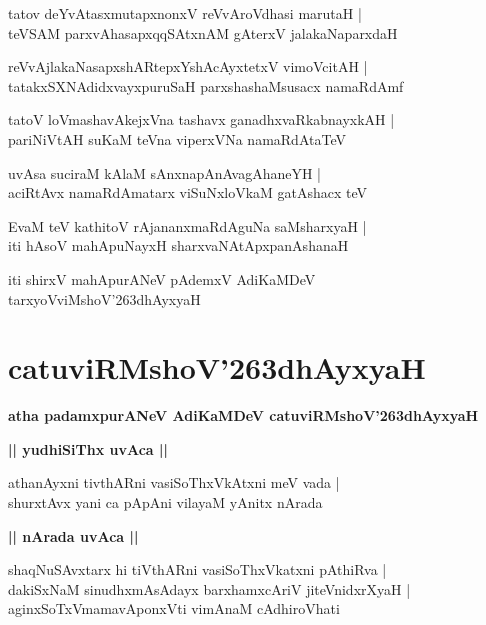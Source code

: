 \documentclass[twoside,12pt,openright]{book}
\def\S{\char'263}
\newcounter{shloka}[chapter]
\def\uvaca#1{\centerline{{\large\textbf{#1}}}}
\begin{document}
\begin{shloka}
tatov deYvAtasxmutapxnonxV reVvAroVdhasi marutaH |\\
teVSAM parxvAhasapxqqSAtxnAM gAterxV jalakaNaparxdaH 
\end{shloka}

\begin{shloka}
reVvAjlakaNasapxshARtepxYshAcAyxtetxV vimoVcitAH |\\
tatakxSXNAdidxvayxpuruSaH parxshashaMsusacx namaRdAmf 
\end{shloka}

\begin{shloka}
tatoV loVmashavAkejxVna tashavx ganadhxvaRkabnayxkAH |\\
pariNiVtAH suKaM teVna viperxVNa namaRdAtaTeV 
\end{shloka}

\begin{shloka}
uvAsa suciraM kAlaM sAnxnapAnAvagAhaneYH |\\
aciRtAvx namaRdAmatarx viSuNxloVkaM gatAshacx teV 
\end{shloka}

\begin{shloka}
EvaM teV kathitoV rAjananxmaRdAguNa saMsharxyaH |\\
iti hAsoV mahApuNayxH sharxvaNAtApxpanAshanaH 
\end{shloka}

\begin{center}
iti shirxV mahApurANeV pAdemxV AdiKaMDeV tarxyoVviMshoV\S dhAyxyaH 
\end{center}

\chapter{catuviRMshoV\S dhAyxyaH}

\begin{center}
{\LARGE\bfseries atha padamxpurANeV AdiKaMDeV catuviRMshoV\S dhAyxyaH}
\end{center}

\uvaca{|| yudhiSiThx uvAca ||}

\begin{shloka}
athanAyxni tivthARni vasiSoThxVkAtxni meV vada |\\
shurxtAvx yani ca pApAni vilayaM yAnitx nArada 
\end{shloka}

\uvaca{|| nArada uvAca ||}

\begin{shloka}
shaqNuSAvxtarx hi tiVthARni vasiSoThxVkatxni pAthiRva |\\
dakiSxNaM sinudhxmAsAdayx barxhamxcAriV jiteVnidxrXyaH |\\
aginxSoTxVmamavAponxVti vimAnaM cAdhiroVhati 
\end{shloka}
\end{document}

